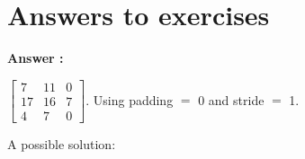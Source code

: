 \newpage
\section{Answers to exercises}
\begin{list}{
\textbf{Answer :}~}{}

\item \noindent 
$\left[\begin{smallmatrix}
7 & 11 & 0\\
17 & 16 & 7\\
4 & 7 & 0
\end{smallmatrix}\right]$. Using padding $=$ 0 and stride $=$ 1.




\item \noindent

A possible solution:


\end{list}
